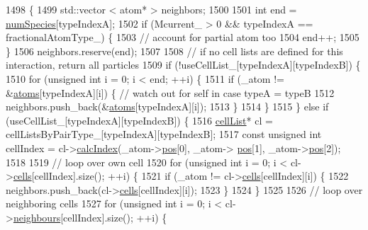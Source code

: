 \begin{DoxyCode}
1498                                                                                                            
                    \{
1499     std::vector < atom* > neighbors;
1500 
1501     \textcolor{keywordtype}{int} end = \hyperlink{classsim_system_a9eea865e6dc1cff377b1e79c4d9c23f0}{numSpecies}[typeIndexA];
1502     \textcolor{keywordflow}{if} (Mcurrent\_ > 0 && typeIndexA == fractionalAtomType\_) \{
1503         \textcolor{comment}{// account for partial atom too}
1504         end++;
1505     \}
1506     neighbors.reserve(end);
1507 
1508     \textcolor{comment}{// if no cell lists are defined for this interaction, return all particles}
1509     \textcolor{keywordflow}{if} (!useCellList\_[typeIndexA][typeIndexB]) \{
1510         \textcolor{keywordflow}{for} (\textcolor{keywordtype}{unsigned} \textcolor{keywordtype}{int} i = 0; i < end; ++i) \{
1511             \textcolor{keywordflow}{if} (\_atom != &\hyperlink{classsim_system_a90421b19082f7fb8fc23b7264b1161e4}{atoms}[typeIndexA][i]) \{ \textcolor{comment}{// watch out for self in case typeA = typeB}
1512                 neighbors.push\_back(&\hyperlink{classsim_system_a90421b19082f7fb8fc23b7264b1161e4}{atoms}[typeIndexA][i]);
1513             \}
1514         \}
1515     \} \textcolor{keywordflow}{else} \textcolor{keywordflow}{if} (useCellList\_[typeIndexA][typeIndexB]) \{
1516         \hyperlink{classcell_list}{cellList}* cl = cellListsByPairType\_[typeIndexA][typeIndexB];
1517         \textcolor{keyword}{const} \textcolor{keywordtype}{unsigned} \textcolor{keywordtype}{int} cellIndex = cl->\hyperlink{classcell_list_aa6b843131cd487164a137571c7343cab}{calcIndex}(\_atom->\hyperlink{classatom_a3ae5f4880e7831d8b2c9fda72b4eb24a}{pos}[0], \_atom->
      \hyperlink{classatom_a3ae5f4880e7831d8b2c9fda72b4eb24a}{pos}[1], \_atom->\hyperlink{classatom_a3ae5f4880e7831d8b2c9fda72b4eb24a}{pos}[2]);
1518 
1519         \textcolor{comment}{// loop over own cell}
1520         \textcolor{keywordflow}{for} (\textcolor{keywordtype}{unsigned} \textcolor{keywordtype}{int} i = 0; i < cl->\hyperlink{classcell_list_a10bc0c3ae819293b1e88bc7d1bfdb2aa}{cells}[cellIndex].size(); ++i) \{
1521             \textcolor{keywordflow}{if} (\_atom != cl->\hyperlink{classcell_list_a10bc0c3ae819293b1e88bc7d1bfdb2aa}{cells}[cellIndex][i]) \{
1522                 neighbors.push\_back(cl->\hyperlink{classcell_list_a10bc0c3ae819293b1e88bc7d1bfdb2aa}{cells}[cellIndex][i]);
1523             \}
1524         \}
1525 
1526         \textcolor{comment}{// loop over neighboring cells}
1527         \textcolor{keywordflow}{for} (\textcolor{keywordtype}{unsigned} \textcolor{keywordtype}{int} i = 0; i < cl->\hyperlink{classcell_list_ada607886d0e5a20d710dde694d6d989f}{neighbours}[cellIndex].size(); ++i) \{

\end{DoxyCode}
